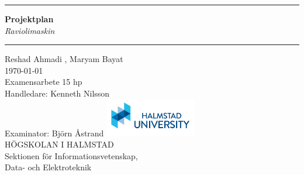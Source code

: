 \documentclass[11pt,a4paper,oneside]{book}
\begin{document}
\pagestyle{empty}

\frontmatter

\begin{titlepage}
  \begin{center}
  \end{center}
  \vspace{3cm}
  \begin{center}
    \hrule \vspace{0.5cm}
    {\Huge \bfseries \sffamily \color{hhblue} Projektplan}\\
    \vspace{0.5cm} {\Large\emph{Raviolimaskin}}
    \vspace{0.8cm} \hrule \vspace{2cm} {\Large{Reshad Ahmadi , Maryam Bayat}}\\
    \vspace{2cm}
    \today\\
    \vspace{3cm}
    Examensarbete 15 hp\\
    \vspace{1.5cm}
    Handledare: Kenneth Nilsson\\
    \vspace{0.5cm} Examinator: Björn Åstrand \vfill
    \includegraphics[width=4cm]{images/hh_logo.jpg}\\
    HÖGSKOLAN I HALMSTAD\\
    Sektionen för Informationsvetenskap, \\
    Data- och Elektroteknik
  \end{center}
\end{titlepage}
\end{document}
